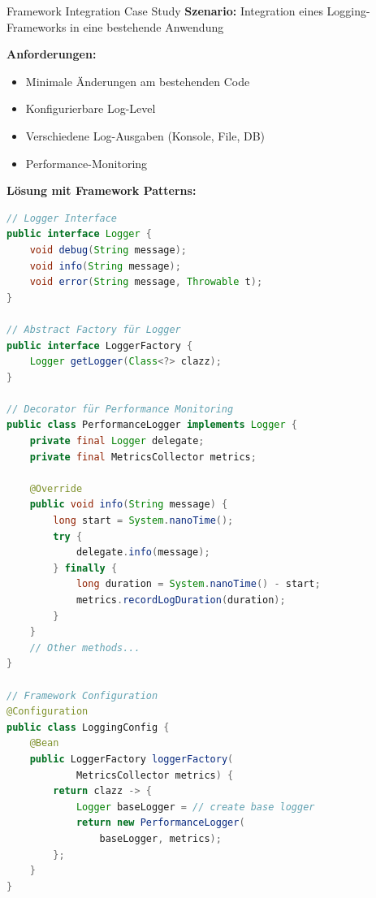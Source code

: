 \begin{example2}{Framework Integration Case Study}
\textbf{Szenario:}
Integration eines Logging-Frameworks in eine bestehende Anwendung

\textbf{Anforderungen:}
\begin{itemize}
    \item Minimale Änderungen am bestehenden Code
    \item Konfigurierbare Log-Level
    \item Verschiedene Log-Ausgaben (Konsole, File, DB)
    \item Performance-Monitoring
\end{itemize}

\textbf{Lösung mit Framework Patterns:}
\begin{lstlisting}[language=Java, style=base]
// Logger Interface
public interface Logger {
    void debug(String message);
    void info(String message);
    void error(String message, Throwable t);
}

// Abstract Factory für Logger
public interface LoggerFactory {
    Logger getLogger(Class<?> clazz);
}

// Decorator für Performance Monitoring
public class PerformanceLogger implements Logger {
    private final Logger delegate;
    private final MetricsCollector metrics;
    
    @Override
    public void info(String message) {
        long start = System.nanoTime();
        try {
            delegate.info(message);
        } finally {
            long duration = System.nanoTime() - start;
            metrics.recordLogDuration(duration);
        }
    }
    // Other methods...
}

// Framework Configuration
@Configuration
public class LoggingConfig {
    @Bean
    public LoggerFactory loggerFactory(
            MetricsCollector metrics) {
        return clazz -> {
            Logger baseLogger = // create base logger
            return new PerformanceLogger(
                baseLogger, metrics);
        };
    }
}
\end{lstlisting}
\end{example2}

